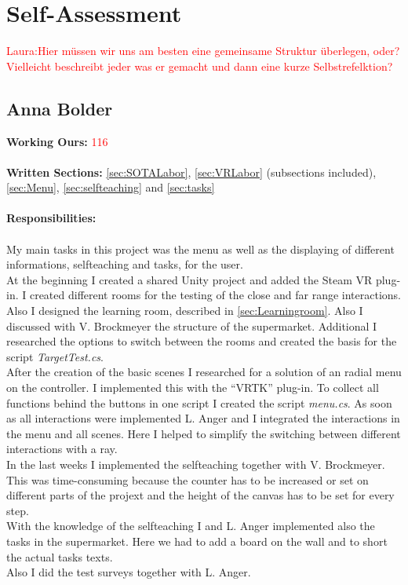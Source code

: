 \section{Self-Assessment} \label{sec:SA} %

\textcolor{red}{Laura:Hier müssen wir uns am besten eine gemeinsame Struktur überlegen, oder? Vielleicht beschreibt jeder was er gemacht und dann eine kurze Selbstrefelktion?}


\subsection{Anna Bolder} \label{sec:SAAnna}

\textbf{Working Ours:} \textcolor{red}{116} \\ \\
\textbf{Written Sections:} \ref{sec:SOTALabor},  \ref{sec:VRLabor} (subsections included), \ref{sec:Menu}, \ref{sec:selfteaching} and \ref{sec:tasks} \\ \\
\textbf{Responsibilities:}\\ \\
My main tasks in this project was the menu as well as the displaying of different informations, selfteaching and tasks, for the user. \\
At the beginning I created a shared Unity project and added the Steam VR plug-in. I created different rooms for the testing of the close and far range interactions. Also I designed the learning room, described in \ref{sec:Learningroom}. Also I discussed with V. Brockmeyer the structure of the supermarket. Additional I researched the options to switch between the rooms and created the basis for the script \textit{TargetTest.cs}.\\
After the creation of the basic scenes I researched for a solution of an radial menu on the controller. I implemented this with the ``VRTK'' plug-in. To collect all functions behind the buttons in one script I created the script \textit{menu.cs}.
As soon as all interactions were implemented L. Anger and I integrated the interactions in the menu and all scenes. Here I helped to simplify the switching between different interactions with a ray. \\
In the last weeks I implemented the selfteaching together with V. Brockmeyer. This was time-consuming because the counter has to be increased or set on different parts of the projext and the height of the canvas has to be set for every step.\\
With the knowledge of the selfteaching I and L. Anger implemented also the tasks in the supermarket. Here we had to add a board on the wall and to short the actual tasks texts. \\
Also I did the test surveys together with L. Anger.\\

